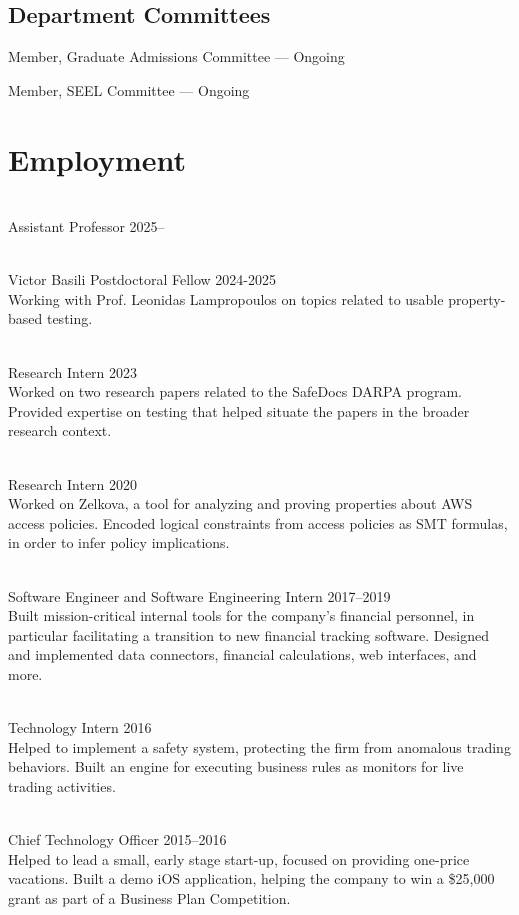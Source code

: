 \documentclass[a4paper]{article}
\begin{document}
\subsection*{Department Committees}

\noindent Member, Graduate Admissions Committee --- Ongoing

\bigskip
\noindent Member, SEEL Committee --- Ongoing

\section*{Employment}

 \\
Assistant Professor 2025--

\bigskip
{} \\
Victor Basili Postdoctoral Fellow 2024-2025 \\
Working with Prof. Leonidas Lampropoulos on topics related to usable
property-based testing.

\bigskip
{} \\
Research Intern 2023 \\
Worked on two research papers related to the SafeDocs DARPA program. Provided
expertise on testing that helped situate the papers in the broader research
context.

\bigskip
{} \\
Research Intern 2020 \\
Worked on Zelkova, a tool for analyzing and proving properties about AWS access
policies. Encoded logical constraints from access policies as SMT formulas, in
order to infer policy implications.

\bigskip
{} \\
Software Engineer and Software Engineering Intern 2017--2019 \\
Built mission-critical internal tools for the company’s financial personnel, in
particular facilitating a transition to new financial tracking software.
Designed and implemented data connectors, financial calculations, web
interfaces, and more.

\bigskip
{} \\
Technology Intern 2016 \\
Helped to implement a safety system, protecting the firm from anomalous trading
behaviors. Built an engine for executing business rules as monitors for live
trading activities.

\bigskip
{} \\
Chief Technology Officer 2015--2016 \\
Helped to lead a small, early stage start-up, focused on providing one-price
vacations. Built a demo iOS application, helping the company to win a \$25,000
grant as part of a Business Plan Competition.
\end{document}
